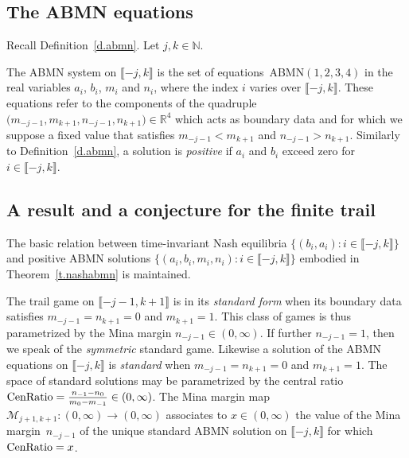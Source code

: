 \documentclass[letterpaper,11pt,oneside,reqno]{amsbook}
\newcommand{\N}{\ensuremath{\mathbb{N}}}
\newcommand{\R}{\ensuremath{\mathbb{R}}}
\numberwithin{figure}{chapter}
\theoremstyle{definition}
\theoremstyle{definition}
\theoremstyle{definition}
\theoremstyle{definition}
\theoremstyle{definition}
\newcommand{\nwithzero}{\N}
\newcommand{\centralratio}{{\rm CenRatio}}
\newcommand{\minamm}{\mathcal{M}}
\newcommand{\abmnmac}{\textrm{ABMN}}
\newcommand{\abmnmacspace}{\textrm{ABMN} }
\def\hfff#1{\label{#1}}
\begin{document}
\subsection{The \abmnmacspace equations}
Recall Definition~\ref{d.abmn}. Let $j,k \in \nwithzero$.

The \abmnmacspace system on $\llbracket -j,k \rrbracket$ is the set of equations~\abmnmac$(1,2,3,4)$  in the real variables $a_i$, $b_i$, $m_i$ and $n_i$, where the index $i$ varies over 
$\llbracket -j,k \rrbracket$. 
These equations 
refer to the components of the quadruple $\big( m_{-j-1},m_{k+1},n_{-j-1},n_{k+1} \big) \in \R^4$ which acts as boundary data and for which we suppose a fixed value that satisfies $m_{-j-1}< m_{k+1}$ and $n_{-j-1} > n_{k+1}$. Similarly to Definition~\ref{d.abmn}, a solution is {\em positive} 
if $a_i$ and $b_i$ exceed zero for $i \in \llbracket -j,k \rrbracket$.

\subsection{A result and a conjecture for the finite trail}\label{s.resultandconjecture}

The basic relation between time-invariant Nash equilibria $\big\{ (b_i,a_i): i \in \llbracket -j,k \rrbracket \big\}$
and positive ABMN solutions  $\big\{ (a_i,b_i,m_i,n_i): i \in \llbracket -j,k \rrbracket \big\}$ embodied in Theorem~\ref{t.nashabmn} is maintained.

The trail game on $\llbracket -j-1,k+1 \rrbracket$ is in its {\em standard form} when its boundary data satisfies  $m_{-j-1} = n_{k+1} = 0$ and $m_{k+1}=1$. This class of games is thus parametrized by the Mina margin $n_{-j-1} \in (0,\infty)$. If further $n_{-j-1} =1$, then we speak of the  {\em symmetric} standard game.
Likewise a solution of the ABMN equations on $\llbracket -j,k \rrbracket$ is  {\em standard} when   $m_{-j-1} = n_{k+1} = 0$ and $m_{k+1}=1$. The space of standard solutions may be parametrized by
the central ratio $\centralratio = \tfrac{n_{-1}- n_0}{m_0 - m_{-1}} \in (0,\infty)$. The Mina margin map\hfff{MMM.finite}
 $\minamm_{j+1,k+1}:(0,\infty) \to (0,\infty)$ associates to $x \in (0,\infty)$ the value of the Mina margin~$n_{-j-1}$
of the unique standard \abmnmacspace solution on $\llbracket -j,k \rrbracket$ for which $\centralratio =x$. 
\end{document}
